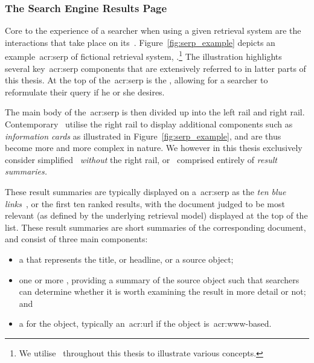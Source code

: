 \subsubsection{The Search Engine Results Page}\label{sec:ir_background:user:iir:serp}
Core to the experience of a searcher when using a given retrieval system are the interactions that take place on its~. Figure~\ref{fig:serp_example} depicts an example~\gls{acr:serp} of fictional retrieval system, \searchlogo.\footnote{We utilise \searchlogo~throughout this thesis to illustrate various concepts.} The illustration highlights several key~\gls{acr:serp} components that are extensively referred to in latter parts of this thesis. At the top of the~\gls{acr:serp} is the , allowing for a searcher to reformulate their query if he or she desires.

The main body of the~\gls{acr:serp} is then divided up into the left rail and right rail. Contemporary~ utilise the right rail to display additional components such as \emph{information cards} as illustrated in Figure~\ref{fig:serp_example}, and are thus become more and more complex in nature. We however in this thesis exclusively consider simplified~ \emph{without} the right rail, or~ comprised entirely of \emph{result summaries.}

These result summaries are typically displayed on a~\gls{acr:serp} as the \emph{ten blue links}~\citep{hearst2009_search}, or the first ten ranked results, with the document judged to be most relevant (as defined by the underlying retrieval model) displayed at the top of the list. These result summaries are short summaries of the corresponding document, and consist of three main components:

\begin{itemize}
    \item{a  that represents the title, or headline, or a source object;}
    \item{one or more , providing a summary of the source object such that searchers can determine whether it is worth examining the result in more detail or not; and}
    \item{a  for the object, typically an~\gls{acr:url} if the object is~\gls{acr:www}-based.}
\end{itemize}

